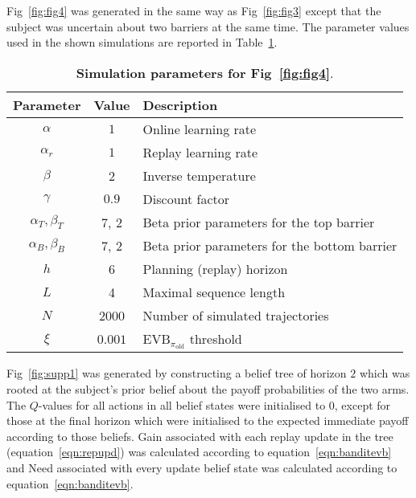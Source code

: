 Fig~\ref{fig:fig4} was generated in the same way as Fig~\ref{fig:fig3} except that the subject was uncertain about two barriers at the same time. The parameter values used in the shown simulations are reported in Table~\ref{tbl:tbl4}.

\begin{table}[h!]
    \centering
    \begin{tabular}{c|c|l}
         Parameter & Value & Description \\ \hline
         $\alpha$ & $1$ & Online learning rate \\
         $\alpha_r$ & $1$ & Replay learning rate \\
         $\beta$ & 2 & Inverse temperature \\
         $\gamma$ & $0.9$ & Discount factor \\
         $\alpha_T, \beta_T$ & 7, 2 & Beta prior parameters for the top barrier \\
         $\alpha_B, \beta_B$ & 7, 2 & Beta prior parameters for the bottom barrier \\
         $h$ & 6 & Planning (replay) horizon \\
         $L$ & 4 & Maximal sequence length \\
         $N$ & 2000 & Number of simulated trajectories \\ 
         $\xi$ & $0.001$ & $\text{EVB}_{\pi_{\text{old}}}$ threshold \\
    \end{tabular}
    \caption{\textbf{Simulation parameters for Fig~\ref{fig:fig4}}.}
    \label{tbl:tbl4}
\end{table}

Fig~\ref{fig:supp1} was generated by constructing a belief tree of horizon $2$ which was rooted at the subject's prior belief about the payoff probabilities of the two arms. The $Q$-values for all actions in all belief states were initialised to $0$, except for those at the final horizon which were initialised to the expected immediate payoff according to those beliefs. Gain associated with each replay update in the tree (equation~\ref{eqn:repupd}) was calculated according to equation~\ref{eqn:banditevb} and Need associated with every update belief state was calculated according to equation~\ref{eqn:banditevb}.

